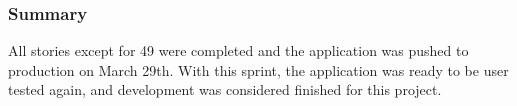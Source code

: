 \subsubsection{Summary}
All stories except for 49 were completed and the application was pushed to production on March 29th. With this sprint, the application was ready to be user tested again, and development was considered finished for this project.

